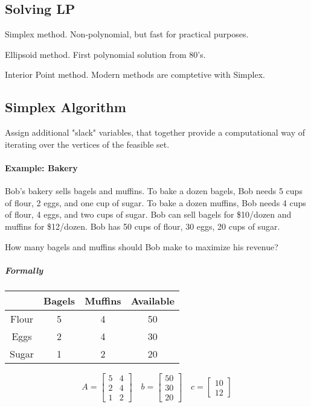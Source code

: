 \documentclass[a4paper]{article}
\newenvironment{itemize*}%
  {\begin{itemize}%
    \setlength{\itemsep}{0pt}%
    \setlength{\parsep}{0pt}%
    \setlength{\parskip}{0pt}}%
  {\end{itemize}}
\begin{document}
\subsection{Solving LP}
\begin{itemize*}
  \item Simplex method. Non-polynomial, but fast for practical purposes.
  \item Ellipsoid method. First polynomial solution from 80's.
  \item Interior Point method. Modern methods are comptetive with Simplex.
\end{itemize*}

\subsection{Simplex Algorithm}
Assign additional "slack" variables, that together provide a computational way of iterating over the vertices of the feasible set.

\paragraph{Example: Bakery}
Bob's bakery sells bagels and muffins.
To bake a dozen bagels, Bob needs 5 cups of flour, 2 eggs, and one cup of sugar.
To bake a dozen muffins, Bob needs 4 cups of flour, 4 eggs, and two cups of sugar.
Bob can sell bagels for \$10/dozen and muffins for \$12/dozen.
Bob has 50 cups of flour, 30 eggs, 20 cups of sugar.

How many bagels and muffins should Bob make to maximize his revenue?

\subparagraph{Formally}

\begin{tabu} to \linewidth {c|ccc}
& Bagels & Muffins & Available \\
\hline
Flour & 5 & 4 & 50 \\
Eggs & 2 & 4 & 30 \\
Sugar & 1 & 2 & 20
\end{tabu}

\[
A=\begin{bmatrix}
5 & 4 \\
2 & 4 \\
1 & 2
\end{bmatrix}
\quad
b=\begin{bmatrix}
50 \\
30 \\
20
\end{bmatrix}
\quad
c=\begin{bmatrix}
10 \\
12
\end{bmatrix}
\]
\end{document}
